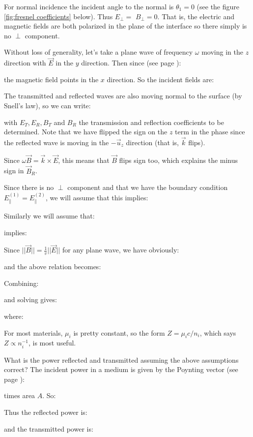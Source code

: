 	For normal incidence the incident angle to the normal is $\theta_{1}=0$ (see the figure \ref{fig:fresnel coefficients} below). Thus $E_{\perp}=$ $B_{\perp}=0$. That is, the electric and magnetic fields are both polarized in the plane of the interface so there simply is no $\perp$ component. 
	
	Without loss of generality, let's take a plane wave of frequency $\omega$ moving in the $z$ direction with $\vec{E}$ in the $y$ direction. Then since (see page \pageref{wave equation by wave vector}):
	
	the magnetic field points in the $x$ direction. So the incident fields are:
	
	The transmitted and reflected waves are also moving normal to the surface (by Snell's law), so we can write:
	
	with $E_{T}, E_{R}, B_{T}$ and $B_{R}$ the transmission and reflection coefficients to be determined. Note that we have flipped the sign on the $z$ term in the phase since the reflected wave is moving in the $-\vec{u}_z$ direction (that is, $\vec{k}$ flips).
	
	 Since $\omega \vec{B}=\vec{k} \times \vec{E}$, this means that $\vec{B}$ flips sign too, which explains the minus sign in $\vec{B}_R$. 
	 
	 Since there is no $\perp$ component and that we have the boundary condition $E_{\|}^{(1)}=E_{\|}^{(2)}$, we will assume that this implies:
	
	Similarly we will assume that:
	
	implies:
	
	Since $||\vec{B}||=\frac{1}{v}||\vec{E}||$ for any plane wave, we have obviously:
	
	and the above relation becomes:
	
	Combining:
	
	and solving gives:
	
	where:
	
	For most materials, $\mu_i$ is pretty constant, so the form $Z=\mu_i c /n_i$, which says $Z \propto n_i^{-1}$, is most useful. 
	
	What is the power reflected and transmitted assuming the above assumptions correct? The incident power in a medium is given by the Poynting vector (see page \pageref{poynting vector}):
	
	times area $A$. So:
	
	Thus the reflected power is:
	
	and the transmitted power is:
	
